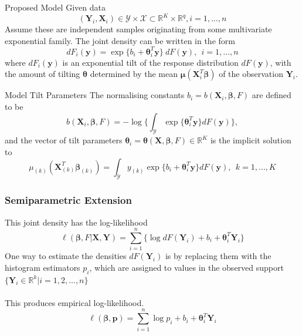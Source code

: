 \documentclass[9pt,notes=hide]{beamer}
\newcommand{\vect}[1]{\boldsymbol #1}
\newcommand{\by}{\vect{y}}
\newcommand{\R}{\mathbb R}
\newcommand{\vbe}{\vect{\beta}}
\newcommand{\X}{\vect{X}}
\newcommand{\Y}{\vect{Y}}
\begin{document}
\begin{frame}{Proposed Model}
	Given data
	\[
		(\Y_i, \X_i) \in \mathcal{Y} \times \mathcal{X} \subset \R^K \times \R^q, i = 1,\dots, n
	\]
	\pause
	Assume these are independent samples originating from some multivariate exponential family.
	The joint density can be written in the form
	\begin{equation*}\label{eq:referencDistribution}
		dF_i(\by) = \exp\{b_i + \vect{\theta}_i^T\by \}  \ dF(\by),  \  \ i = 1,\dots, n
	\end{equation*}
	\pause
	where $dF_i(\by)$ is an exponential tilt of the response distribution $dF(\by)$,
	with the amount of tilting $\vect{\theta}$ determined by the mean
	$\vect{\mu}(\X_i^T\vbe)$ of the observation $\Y_i$.
\end{frame}



\begin{frame}{Model Tilt Parameters}
	The normalising constants $b_i = b(\X_i, \vbe,F)$ are defined to be
	\begin{equation*}\label{eq:normalisationConstraint}
		b(\X_i, \vbe, F) = -\log \Bigg\{\int_{\mathcal{Y}} \exp\{\vect{\theta}_i^T\by \}dF(\by) \Bigg\},
	\end{equation*}
	\pause
	and the vector of tilt parameters $\vect{\theta}_i = \vect{\theta}(\X, \vbe, F) \in \R^K$ is the implicit solution to
	\begin{equation*}\label{eq:MeanConstraint}
		\mu_{(k)}(\X_{(k)}^T\vbe_{(k)}) = \int_{\mathcal{Y}}y_{(k)}\exp\{b_i + \vect{\theta}_i^T\by \}dF(\by),  \  \ k = 1,\dots,K
	\end{equation*}
\end{frame}


\begin{frame}
	\frametitle{Semiparametric Extension}
	This joint density has the log-likelihood
	\begin{equation*}\label{eq:SemiParametricLikelihood}
		\ell(\vbe, F|\X, \Y) = \sum_{i = 1}^{n} \Bigg\{ \log dF(\Y_i) + b_i + \vect{\theta}_i^T\Y_i\Bigg\}
	\end{equation*}
	\pause
	One way to estimate the densities $dF(\Y_i)$ is by replacing them  with the
	histogram estimators $p_i$, which  are assigned to values in the observed
	support $\{\Y_i \in \R^k| i = 1, 2, \dots, n \}$\\
	\pause
	\vspace{0.1cm}\\
	This produces empirical log-likelihood.
	\begin{equation*}\label{eq:chap2:empiricalLogLikelihood}
		\ell(\vbe, \vect{p}) = \sum_{i = 1}^{n} \log p_i + b_i + \vect{\theta}_i^T\Y_i
	\end{equation*}

\end{frame}
\end{document}
